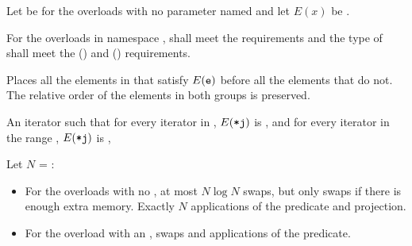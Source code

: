 \begin{itemdescr}
\pnum
\pnum
Let  be  for the overloads
with no parameter named 
and let $E(x)$ be .

\requires
For the overloads in namespace ,
 shall meet the
 requirements and
the type of  shall meet the
 () and
 () requirements.

\pnum
\effects
Places all the elements  in 
that satisfy $E(\texttt{e})$ before all the
elements that do not.
The relative order of the elements in both groups is preserved.

\pnum
\returns
An iterator
such that for every iterator
in
,
$E(\texttt{*j})$ is ,
and for every iterator
in the range
,
$E(\texttt{*j})$ is ,

\pnum
\complexity
Let $N$ = :
\begin{itemize}
\item For the overloads with no , at most $N \log N$ swaps,
but only  swaps if there is enough extra memory.  Exactly $N$
applications of the predicate and projection.
\item For the overload with an ,
 swaps and  applications of the predicate.
\end{itemize}

\end{itemdescr}

